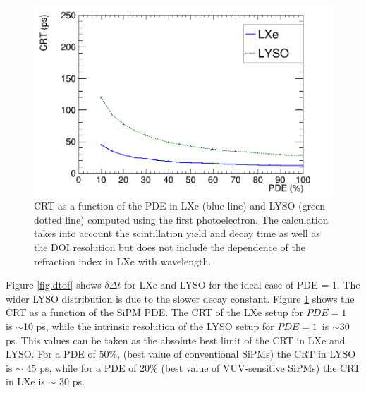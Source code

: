 \documentclass[review]{elsarticle}
\begin{document}
\begin{figure}[!bhtp]
	\centering
	\includegraphics[scale=0.36]{../img/PetaloTOF/CRTvsPDELXeLYSONoJitterFstPE.png}
	\caption{\label{fig.crt1} CRT as a function of the PDE in LXe (blue line) and LYSO (green dotted line) computed using the first photoelectron. The calculation takes into account the scintillation yield and decay time as well as the DOI resolution but does not include
	the dependence of the refraction index in LXe with wavelength.}
\end{figure}

 Figure \ref{fig.dtof} shows $\delta \Delta t$ for LXe and LYSO for the ideal case of PDE = 1. The wider LYSO distribution is due to the slower decay constant.  Figure \ref{fig.crt1} shows the CRT as a function of the
 SiPM PDE. The CRT of the LXe setup for $PDE=1$~ is $\sim$10 ps, while the
 intrinsic resolution of the LYSO setup for $PDE=1$~is $\sim$30 ps.  This values can be taken as the absolute best limit of the CRT in LXe and LYSO. For a PDE of 50\%, (best value of conventional SiPMs) the CRT in LYSO is $\sim$ 45 ps, while for a PDE of 20\% (best value of VUV-sensitive SiPMs) the CRT in LXe is $\sim$ 30 ps.   
\end{document}
